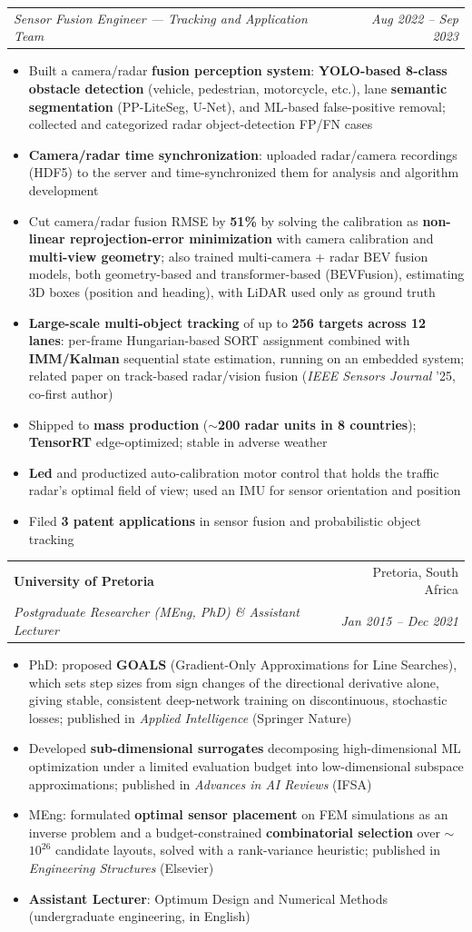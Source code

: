 \documentclass[letterpaper,11pt]{article}
\makeatletter
\newcommand{\resumeItem}[1]{\item\small{{#1 \vspace{-2pt}}}}
\newcommand{\resumeSubheading}[4]{
  \vspace{-2pt}\item
    \begin{tabular*}{0.97\textwidth}[t]{l@{\extracolsep{\fill}}r}
      \textbf{#1} & #2 \\
      \textit{\small#3} & \textit{\small #4} \\
    \end{tabular*}\vspace{-7pt}
}
\newcommand{\resumeSubSubheading}[2]{
    \item
    \begin{tabular*}{0.97\textwidth}{l@{\extracolsep{\fill}}r}
      \textit{\small#1} & \textit{\small #2} \\
    \end{tabular*}\vspace{-7pt}
}
\newcommand{\resumeItemListStart}{\begin{itemize}[itemsep=0pt]}
\newcommand{\resumeItemListEnd}{\end{itemize}\vspace{-5pt}}
\makeatother
\begin{document}
    \resumeSubSubheading
      {Sensor Fusion Engineer --- Tracking and Application Team}{Aug 2022 -- Sep 2023}
      \resumeItemListStart
        \resumeItem{Built a camera/radar \textbf{fusion perception system}: \textbf{YOLO-based 8-class obstacle detection} (vehicle, pedestrian, motorcycle, etc.), lane \textbf{semantic segmentation} (PP-LiteSeg, U-Net), and ML-based false-positive removal; collected and categorized radar object-detection FP/FN cases}
        \resumeItem{\textbf{Camera/radar time synchronization}: uploaded radar/camera recordings (HDF5) to the server and time-synchronized them for analysis and algorithm development}
        \resumeItem{Cut camera/radar fusion RMSE by \textbf{51\%} by solving the calibration as \textbf{non-linear reprojection-error minimization} with camera calibration and \textbf{multi-view geometry}; also trained multi-camera + radar BEV fusion models, both geometry-based and transformer-based (BEVFusion), estimating 3D boxes (position and heading), with LiDAR used only as ground truth}
        \resumeItem{\textbf{Large-scale multi-object tracking} of up to \textbf{256 targets across 12 lanes}: per-frame Hungarian-based SORT assignment combined with \textbf{IMM/Kalman} sequential state estimation, running on an embedded system; related paper on track-based radar/vision fusion (\textit{IEEE Sensors Journal} '25, co-first author)}
        \resumeItem{Shipped to \textbf{mass production} (\textbf{$\sim$200 radar units in 8 countries}); \textbf{TensorRT} edge-optimized; stable in adverse weather}
        \resumeItem{\textbf{Led} and productized auto-calibration motor control that holds the traffic radar's optimal field of view; used an IMU for sensor orientation and position}
        \resumeItem{Filed \textbf{3 patent applications} in sensor fusion and probabilistic object tracking}
      \resumeItemListEnd

    \resumeSubheading
      {University of Pretoria}{Pretoria, South Africa}
      {Postgraduate Researcher (MEng, PhD) \& Assistant Lecturer}{Jan 2015 -- Dec 2021}
      \resumeItemListStart
        \resumeItem{PhD: proposed \textbf{GOALS} (Gradient-Only Approximations for Line Searches), which sets step sizes from sign changes of the directional derivative alone, giving stable, consistent deep-network training on discontinuous, stochastic losses; published in \textit{Applied Intelligence} (Springer Nature)}
        \resumeItem{Developed \textbf{sub-dimensional surrogates} decomposing high-dimensional ML optimization under a limited evaluation budget into low-dimensional subspace approximations; published in \textit{Advances in AI Reviews} (IFSA)}
        \resumeItem{MEng: formulated \textbf{optimal sensor placement} on FEM simulations as an inverse problem and a budget-constrained \textbf{combinatorial selection} over $\sim$$10^{26}$ candidate layouts, solved with a rank-variance heuristic; published in \textit{Engineering Structures} (Elsevier)}
        \resumeItem{\textbf{Assistant Lecturer}: Optimum Design and Numerical Methods (undergraduate engineering, in English)}
      \resumeItemListEnd
\end{document}
